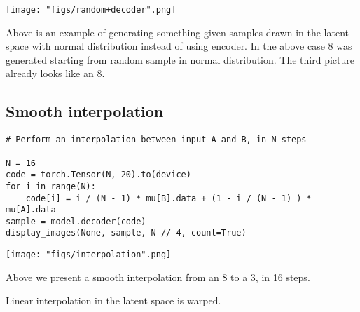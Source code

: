 \texttt{[image: "figs/random+decoder".png]}


Above is an example of generating something given samples drawn in the latent space with normal distribution instead of using encoder. In the above case 8 was generated starting from random sample in normal distribution. The third picture already looks like an 8.

\subsection{Smooth interpolation} 
\begin{verbatim}
# Perform an interpolation between input A and B, in N steps

N = 16
code = torch.Tensor(N, 20).to(device)
for i in range(N):
    code[i] = i / (N - 1) * mu[B].data + (1 - i / (N - 1) ) * mu[A].data
sample = model.decoder(code)
display_images(None, sample, N // 4, count=True)
\end{verbatim}

\texttt{[image: "figs/interpolation".png]}

Above we present a smooth interpolation from an 8 to a 3, in 16 steps.

Linear interpolation in the latent space is warped. 